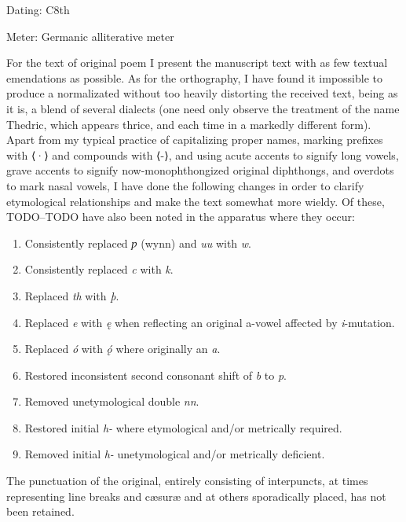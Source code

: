 
\begin{flushright}%
Dating: C8th

Meter: Germanic alliterative meter%
\end{flushright}%


For the text of original poem I present the manuscript text with as few textual emendations as possible. As for the orthography, I have found it impossible to produce a normalizated without too heavily distorting the received text, being as it is, a blend of several dialects (one need only observe the treatment of the name Thedric, which appears thrice, and each time in a markedly different form). Apart from my typical practice of capitalizing proper names, marking prefixes with ⟨·⟩ and compounds with ⟨-⟩, and using acute accents to signify long vowels, grave accents to signify now-monophthongized original diphthongs, and overdots to mark nasal vowels, I have done the following changes in order to clarify etymological relationships and make the text somewhat more wieldy. Of these, TODO–TODO have also been noted in the apparatus where they occur:
\begin{enumerate}
  \item Consistently replaced \emph{ƿ} (wynn) and \emph{uu} with \emph{w}.
  \item Consistently replaced \emph{c} with \emph{k}.
  \item Replaced \emph{th} with \emph{þ}.
  \item Replaced \emph{e} with \emph{ę} when reflecting an original a-vowel affected by \emph{i}-mutation.
  \item Replaced \emph{ó} with \emph{ǫ́} where originally an \emph{a}.
  \item Restored inconsistent second consonant shift of \emph{b} to \emph{p}.
  \item Removed unetymological double \emph{nn}.
  \item Restored initial \emph{h-} where etymological and/or metrically required.
  \item Removed initial \emph{h-} unetymological and/or metrically deficient.
\end{enumerate}

The punctuation of the original, entirely consisting of interpuncts, at times representing line breaks and cæsuræ and at others sporadically placed, has not been retained.

